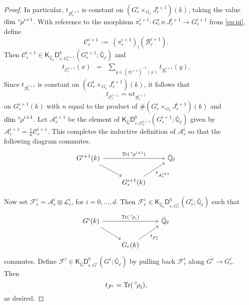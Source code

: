 \documentclass[10pt]{amsart}
\theoremstyle{plain}
\theoremstyle{definition}
\newcommand{\QQ}{{\mathbb{Q}}}
\newcommand{\EE}{\mathbb{\bar Q}_\ell}
\newcommand{\Fq}{k}
\DeclareMathOperator{\trace}{Tr}
\newcommand{\ceq}{{\, :=\, }}
\newcommand{\trFrob}[1]{t_{#1}}
\newcommand{\cs}[1]{{\mathcal{#1}}}
\newcommand{\orho}{{\,^\circ \hskip-1pt \rho}}
\begin{document}
\begin{proof}
In particular, $\trFrob{\cs{B}^{i+1}_r}$ is constant on $(G_r^{i}\times_{G_r} J_r^{i+1})(\Fq)$, taking the value $\dim \orho^{i+1}$.
With reference to the morphism $\pi_r^{i+1} : G_r^i \ltimes J_r^{i+1} \to G_r^{i+1}$ from \eqref{eq:pi}, define 
\[
\cs{C}_r^{i+1} \ceq (\pi_r^{i+1})_! (\cs{B}_r^{i+1}).
\]
Then $\cs{C}_r^{i+1}\in \mathsf{K}_{\EE}\mathsf{D}^b_{c,G_r^{i+1}}(G_r^{i+1};\EE)$ and
\begin{eqnarray*}
\trFrob{\cs{C}^{i+1}_r}(x)
&=& \sum_{y\in (\pi_r^{i+1})^{-1}(x)}  \trFrob{\cs{B}_r^{i+1}}(y).
\end{eqnarray*}
Since $\trFrob{\cs{B}^{i+1}_r}$ is constant on $(G_r^{i}\times_{G_r} J_r^{i+1})(\Fq)$, it follows that 
\[
\trFrob{\cs{C}^{i+1}_r} = n \trFrob{\cs{B}^{i+1}_r}
\]
on $G_r^{i+1}(\Fq)$ with $n$ equal to the product of $\# (G_r^{i}\times_{G_r} J_r^{i+1})(\Fq)$ and $\dim \orho^{i+1}$.
Let $\cs{A}_r^{i+1}$ be the element of $\mathsf{K}_{\bar\QQ}\mathsf{D}^b_{c,G_r^{i+1}}(G_r^{i+1};\EE)$ given by $\cs{A}_r^{i+1} = \frac{1}{n} \cs{C}_r^{i+1}$. 
%
This completes the inductive definition of $\cs{A}_r^i$ so that the following diagram commutes.
\[
\begin{tikzcd}
G^{i+1}(\Fq) \arrow{rr}{\trace(\orho^{i+1})} \arrow{rd} && \EE\\
& G_r^{i+1}(\Fq)\arrow{ru}[swap]{{\trFrob{\cs{A}_r^{i+1}}} } & 
\end{tikzcd}
\]

Now set $\cs{F}^i_r = \cs{A}_r^{i} \otimes \cs{L}_r^i$, for $i=0, \ldots ,d$.
Then $\cs{F}^i_r \in \mathsf{K}_{\EE}\mathsf{D}^b_{c,G_r^{i}}(G_r^{i};\EE)$ such that
\[
\begin{tikzcd}
G^i(\Fq) \arrow{rr}{\trace(\orho_i)} \arrow{rd} && \EE\\
& G_r(\Fq) \arrow{ru}[swap]{\trFrob{\cs{F}^i_r}} & 
\end{tikzcd}
\]
commutes.
Define $\cs{F}^i\in \mathsf{K}_{\bar\QQ}\mathsf{D}^b_{c,G^{i}}(G^{i};\EE)$ by pulling back $\cs{F}_r^i$ along $G^i \to G^i_r$.
Then 
\[
\trFrob{\cs{F}^i} = \trace(\orho_i),
\] 
as desired.
\end{proof}


\bigskip

\end{document}
